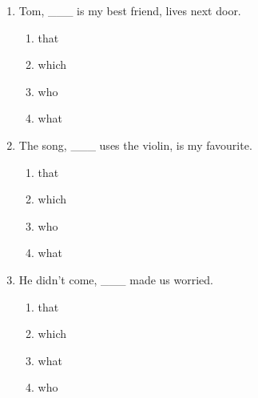 \documentclass[11pt,a4paper]{ctexart}
\begin{document}
\begin{enumerate}[leftmargin=*,itemsep=4pt]
\begin{enumerate}[label=\Alph*.,leftmargin=2em,itemsep=1pt,topsep=2pt]
\item who
\item what
\end{enumerate}
\item Tom, \_\_\_ is my best friend, lives next door.
\begin{enumerate}[label=\Alph*.,leftmargin=2em,itemsep=1pt,topsep=2pt]
\item that
\item which
\item who
\item what
\end{enumerate}
\item The song, \_\_\_ uses the violin, is my favourite.
\begin{enumerate}[label=\Alph*.,leftmargin=2em,itemsep=1pt,topsep=2pt]
\item that
\item which
\item who
\item what
\end{enumerate}
\item He didn’t come, \_\_\_ made us worried.
\begin{enumerate}[label=\Alph*.,leftmargin=2em,itemsep=1pt,topsep=2pt]
\item that
\item which
\item what
\item who
\end{enumerate}
\end{enumerate}
\end{document}
